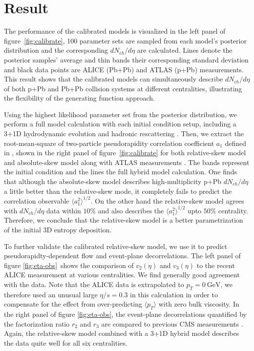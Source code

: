 \documentclass[3p,times,twocolumn]{elsarticle}
\begin{document}
\section{Result}
\label{Result}
The performance of the calibrated models is visualized in the left panel of figure~\ref{fig:calibrate}, 100 parameter sets are sampled from each model's posterior distribution and the corresponding $dN_{ch}/d\eta$ are calculated.
Lines denote the posterior samples' average and thin bands their corresponding standard deviation and black data points are ALICE (Pb+Pb) \cite{Abbas:2013bpa, ALICE:2015kda} and ATLAS (p+Pb) \cite{Aad:2015zza} measurements.
This result shows that the calibrated models can simultaneously describe $dN_{ch}/d\eta$ of both p+Pb and Pb+Pb collision systems at different centralities, illustrating the flexibility of the generating function approach.

Using the highest likelihood parameter set from the posterior distribution, we perform a full model calculation with each initial condition setup, including a 3+1D hydrodynamic evolution \cite{Karpenko:2013wva} and hadronic rescattering \cite{Bass:1998ca, Bleicher:1999xi}.
Then, we extract the root-mean-square of two-particle pseudorapidity correlation coefficient $a_1$ defined in \cite{Bzdak:2012tp}, shown in the right panel of figure~\ref{fig:calibrate} for both relative-skew model and absolute-skew model along with ATLAS measurements \cite{ATLAS:2015kla}. 
The bands represent the initial condition and the lines the full hybrid model calculation.
One finds that although the absolute-skew model describes high-multiplicity p+Pb $dN_{ch}/d\eta$ a little better than the relative-skew mode, it completely fails to predict the correlation observable $\langle a_1^2\rangle^{1/2}$.
On the other hand the relative-skew model agrees with $dN_{ch}/d\eta$ data within $10\%$ and also describes the $\langle a_1^2\rangle^{1/2}$ upto $50\%$ centrality.
Therefore, we conclude that the relative-skew model is a better parametrization of the initial 3D entropy deposition. 

To further validate the calibrated relative-skew model, we use it to predict pseudorapidty-dependent flow and event-plane decorrelations.
The left panel of figure \ref{fig:eta-obs}~shows the comparison of $v_2(\eta)$ and $v_3(\eta)$ to the recent ALICE measurement \cite{Adam:2016ows} at various centralities. We find generally good agreement with the data.
Note that the ALICE data is extrapolated to $p_T = 0~\textrm{GeV}$, we therefore used an unusual large $\eta/s=0.3$ in this calculation in order to compensate for the effect from over-predicting $\langle p_T\rangle$ with zero bulk viscosity.
In the right panel of figure \ref{fig:eta-obs}, the event-plane decorrelations quantified by the factorization ratio $r_2$ and $r_3$ are compared to previous CMS measurements \cite{Khachatryan:2015oea}.
Again, the relative-skew model combined with a 3+1D hybrid model describes the data quite well for all six centralities.
\end{document}
